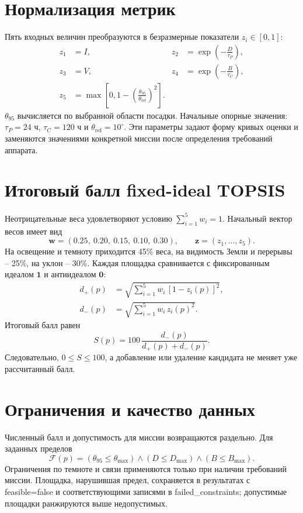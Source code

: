 \documentclass[10pt,a4paper]{article}
\newcommand{\code}[1]{{\ttfamily\small #1}}
\begin{document}
\section{Нормализация метрик}
Пять входных величин преобразуются в безразмерные показатели $z_i\in[0,1]$:
\begin{align}
z_1 &= I, & z_2 &= \exp\!\left(-\frac{D}{\tau_P}\right),\\
z_3 &= V, & z_4 &= \exp\!\left(-\frac{B}{\tau_C}\right),\\
z_5 &= \max\!\left[0,1-\left(\frac{\theta_{95}}{\theta_{\mathrm{ref}}}\right)^2\right].
\end{align}
$\theta_{95}$ вычисляется по выбранной области посадки. Начальные опорные значения: $\tau_P=24$ ч, $\tau_C=120$ ч и $\theta_{\mathrm{ref}}=10^\circ$. Эти параметры задают форму кривых оценки и заменяются значениями конкретной миссии после определения требований аппарата.

\section{Итоговый балл fixed-ideal TOPSIS}
Неотрицательные веса удовлетворяют условию $\sum_{i=1}^{5}w_i=1$. Начальный вектор весов имеет вид
\begin{equation}
\boldsymbol{w}=(0.25,\ 0.20,\ 0.15,\ 0.10,\ 0.30),
\qquad
\boldsymbol{z}=(z_1,\ldots,z_5).
\end{equation}
На освещение и темноту приходится 45\% веса, на видимость Земли и перерывы -- 25\%, на уклон -- 30\%. Каждая площадка сравнивается с фиксированным идеалом $\boldsymbol{1}$ и антиидеалом $\boldsymbol{0}$:
\begin{align}
d_+(p)&=\sqrt{\sum_{i=1}^{5}w_i\,[1-z_i(p)]^2},\\
d_-(p)&=\sqrt{\sum_{i=1}^{5}w_i\,z_i(p)^2}.
\end{align}
Итоговый балл равен
\begin{equation}
\boxed{S(p)=100\,\frac{d_-(p)}{d_+(p)+d_-(p)}}.
\label{eq:score}
\end{equation}
Следовательно, $0\leq S\leq100$, а добавление или удаление кандидата не меняет уже рассчитанный балл.

\newpage

\section{Ограничения и качество данных}
Численный балл и допустимость для миссии возвращаются раздельно. Для заданных пределов
\begin{equation}
\mathcal{F}(p)=
(\theta_{95}\leq\theta_{\max})\land
(D\leq D_{\max})\land
(B\leq B_{\max}).
\end{equation}
Ограничения по темноте и связи применяются только при наличии требований миссии. Площадка, нарушившая предел, сохраняется в результатах с \code{feasible=false} и соответствующими записями в \code{failed\_constraints}; допустимые площадки ранжируются выше недопустимых.
\end{document}
